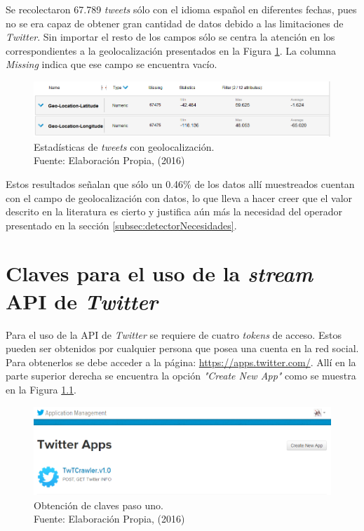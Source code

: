 Se recolectaron 67.789 \textit{tweets} sólo con el idioma español en diferentes fechas, pues no se era capaz de obtener gran cantidad de datos debido a las limitaciones de \textit{Twitter}. Sin importar el resto de los campos sólo se centra la atención en los correspondientes a la geolocalización presentados en la Figura \ref{fig:RMResult}. La columna \textit{Missing} indica que ese campo se encuentra vacío.

\begin{figure}[H]
        \centering
        \captionsetup{justification=centering}
        \includegraphics[scale=0.6]{images/ResultadoRapidMiner.png}
        \caption[Estadísticas de \textit{tweets} con geolocalización.]{Estadísticas de \textit{tweets} con geolocalización.\\Fuente: Elaboración Propia, (2016)}
        \label{fig:RMResult}
\end{figure}

Estos resultados señalan que sólo un 0.46\% de los datos allí muestreados cuentan con el campo de geolocalización con datos, lo que lleva a hacer creer que el valor descrito en la literatura es cierto y justifica aún más la necesidad del operador presentado en la sección \ref{subsec:detectorNecesidades}.

\chapter{Claves para el uso de la \textit{stream} API de \textit{Twitter}}
\label{apendice:clavesApi}

Para el uso de la API de \textit{Twitter} se requiere de cuatro \textit{tokens} de acceso. Estos pueden ser obtenidos por cualquier persona que posea una cuenta en la red social. Para obtenerlos se debe acceder a la página: \url{https://apps.twitter.com/}. Allí en la parte superior derecha se encuentra la opción \textit{"Create New App"} como se muestra en la Figura \ref{fig:CreateNewApp}.

\begin{figure}[H]
        \centering
        \captionsetup{justification=centering}
        \includegraphics[scale=0.6]{images/CreateNewApp.png}
        \caption[Obtención de claves paso uno.]{Obtención de claves paso uno.\\Fuente: Elaboración Propia, (2016)}
        \label{fig:CreateNewApp}
\end{figure}

